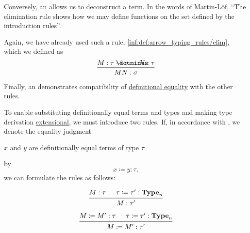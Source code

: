 \begin{remark}
\begin{thmenum}
     Conversely, an  allows us to deconstruct a term. In the words of Martin-L\"of, \enquote{The elimination rule shows how we may define functions on the set defined by the introduction rules}.

    Again, we have already used such a rule, \ref{inf:def:arrow_typing_rules/elim}, which we defined as
    \begin{equation*}
      \begin{prooftree}
        \hypo{ M: \tau \synimplies \sigma }
        \hypo{ N: \tau }
        \infer2{ M N: \sigma }
      \end{prooftree}
    \end{equation*}

     Finally, an  demonstrates compatibility of \hyperref[con:equality]{definitional equality} with the other rules.

    To enable substituting definitionally equal terms and types and making type derivation \hyperref[con:extensionality]{extensional}, we must introduce two rules. If, in accordance with , we denote the equality judgment
    \begin{center}
      \( x \) and \( y \) are definitionally equal terms of type \( \tau \)
    \end{center}
    by
    \begin{equation*}
      x \coloneqq y: \tau,
    \end{equation*}
    we can formulate the rules as follows:
    \begin{paracol}{2}
      \begin{leftcolumn}
        \phantom{alignment hack}
        \begin{equation*}
          \begin{prooftree}
            \hypo{ M: \tau }
            \hypo{ \tau \coloneqq \tau': \op*{Type}_n }
            \infer2{ M: \tau' }
          \end{prooftree}
        \end{equation*}
      \end{leftcolumn}

      \begin{rightcolumn}
        \phantom{alignment hack}
        \begin{equation*}
          \begin{prooftree}
            \hypo{ M \coloneqq M': \tau }
            \hypo{ \tau \coloneqq \tau': \op*{Type}_n }
            \infer2{ M \coloneqq M': \tau' }
          \end{prooftree}
        \end{equation*}
      \end{rightcolumn}
    \end{paracol}


\end{thmenum}
\end{remark}
